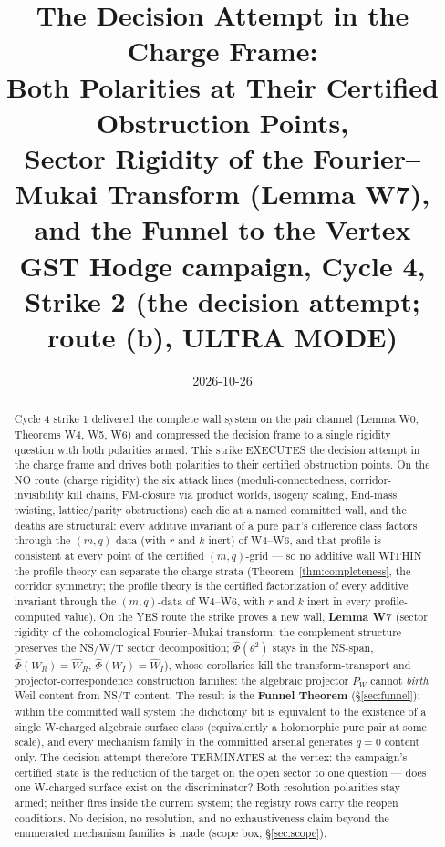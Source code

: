 \documentclass[11pt]{article}
\title{The Decision Attempt in the Charge Frame:\\
Both Polarities at Their Certified Obstruction Points,\\
Sector Rigidity of the Fourier--Mukai Transform (Lemma W7),\\
and the Funnel to the Vertex\\
\large GST Hodge campaign, Cycle 4, Strike 2 (the decision attempt; route (b), ULTRA MODE)}
\date{2026-10-26}
\theoremstyle{definition}
\newcommand{\FMc}{\widehat\Phi}
\begin{document}
\maketitle

\begin{abstract}
\noindent
Cycle 4 strike 1 delivered the complete wall system on the pair channel
(Lemma W0, Theorems W4, W5, W6) and compressed the decision frame to a single
rigidity question with both polarities armed. This strike EXECUTES the decision
attempt in the charge frame and drives both polarities to their certified
obstruction points. On the NO route (charge rigidity) the six attack lines
(moduli-connectedness, corridor-invisibility kill chains, FM-closure via
product worlds, isogeny scaling, End-mass twisting, lattice/parity obstructions)
each die at a named committed wall, and the deaths are structural: every
additive invariant of a pure pair's difference class factors through the $(m,q)$-data (with $r$ and $k$ inert) of
W4--W6, and that profile is consistent at every point of the certified
$(m,q)$-grid --- so no additive wall WITHIN the profile theory can
separate the charge strata (Theorem~\ref{thm:completeness}, the corridor
symmetry; the profile theory is the certified factorization of every
additive invariant through the $(m,q)$-data of W4--W6, with $r$ and $k$ inert in every profile-computed value).
On the YES route the strike proves a new wall, \textbf{Lemma W7} (sector
rigidity of the cohomological Fourier--Mukai transform: the complement
structure preserves the NS/W/T sector decomposition; $\FMc(\theta^2)$ stays in
the NS-span, $\FMc(W_R)=\widehat W_R$, $\FMc(W_I)=\widehat W_I$), whose
corollaries kill the transform-transport and projector-correspondence
construction families: the algebraic projector $P_W$ cannot \emph{birth}
Weil content from NS/T content. The result is the \textbf{Funnel Theorem}
(\S\ref{sec:funnel}): within the committed wall system the dichotomy bit is
equivalent to the existence of a single W-charged algebraic surface class
(equivalently a holomorphic pure pair at some scale), and every mechanism
family in the committed arsenal generates $q=0$ content only. The decision
attempt therefore TERMINATES at the vertex: the campaign's certified state is
the reduction of the target on the open sector to one question --- does one
W-charged surface exist on the discriminator? Both resolution polarities stay
armed; neither fires inside the current system; the registry rows carry the
reopen conditions. No decision, no resolution, and no exhaustiveness claim
beyond the enumerated mechanism families is made (scope box, \S\ref{sec:scope}).
\end{abstract}
\end{document}
